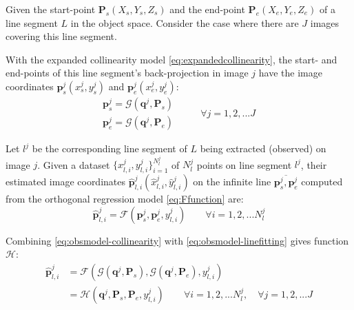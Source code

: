 Given the start-point $\mathbf{P}_s(X_s,Y_s,Z_s)$ and the end-point $\mathbf{P}_e(X_e,Y_e,Z_e)$ of a line segment $L$ in the object space. Consider the case where there are $J$ images covering this line segment.

With the expanded collinearity model \eqref{eq:expandedcollinearity}, the start- and end-points of this line segment's back-projection in image $j$ have the image coordinates $\mathbf{p}^j_s(x^j_s,y^j_s)$ and $\mathbf{p}^j_e(x^j_e,y^j_e)$:
\begin{equation} \label{eq:obsmodel-collinearity}
\begin{split}
\mathbf{p}^j_s = \mathcal{G}(\mathbf{q}^j,\mathbf{P}_s)\\
\mathbf{p}^j_e = \mathcal{G}(\mathbf{q}^j,\mathbf{P}_e)
\end{split}
\qquad
\begin{split}
\forall j=1,2,...J
\end{split}
\end{equation}

Let $l^j$ be the corresponding line segment of $L$ being extracted (observed) on image $j$. Given a dataset $\{x^j_{l,i},y^j_{l,i}\}^{N^j_l}_{i=1}$ of $N^j_l$ points on line segment $l^j$, their estimated image coordinates $\hat{\mathbf{p}}^j_{l,i}(\hat{x}^j_{l,i},\hat{y}^j_{l,i})$ on the infinite line $\overline{\mathbf{p}^j_s,\mathbf{p}^j_e}$ computed from the orthogonal regression model \eqref{eq:Ffunction} are:
\begin{equation} \label{eq:obsmodel-linefitting}
\hat{\mathbf{p}}^j_{l,i} = \mathcal{F}(\mathbf{p}^j_s,\mathbf{p}^j_e,y^j_{l,i})
\qquad
\forall i=1,2,...N^j_l
\end{equation}


Combining \eqref{eq:obsmodel-collinearity} with \eqref{eq:obsmodel-linefitting} gives function $\mathcal{H}$:
\begin{equation} \label{eq:obsmodel}
\begin{split}
\hat{\mathbf{p}}^j_{l,i} &= \mathcal{F}(\mathcal{G}(\mathbf{q}^j,\mathbf{P}_s),\mathcal{G}(\mathbf{q}^j,\mathbf{P}_e),y^j_{l,i})\\
&=\mathcal{H}(\mathbf{q}^j,\mathbf{P}_s,\mathbf{P}_e,y^j_{l,i})
\qquad
\forall i=1,2,...N^j_l,\quad\forall j=1,2,...J
\end{split}
\end{equation}

